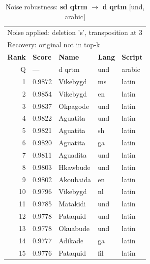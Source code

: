\begin{table}[htbp]
\centering
\small
\caption{Noise robustness: \textbf{sd qtrm} $\rightarrow$ \textbf{d qrtm} [und, arabic]}
\label{tab:noise-36}
\begin{tabular}{rllll}
\toprule
\multicolumn{5}{l}{\small Noise applied: deletion 's', transposition at 3} \\
\multicolumn{5}{l}{\small Recovery: original not in top-k} \\
\midrule
\textbf{Rank} & \textbf{Score} & \textbf{Name} & \textbf{Lang} & \textbf{Script} \\
\midrule
\rowcolor{gray!20} Q & --- & d qrtm & und & arabic \\
\midrule
1 & 0.9872 & Vikebygd & ms & latin \\
2 & 0.9854 & Vikebygd & en & latin \\
3 & 0.9837 & Okpagode & und & latin \\
4 & 0.9822 & Aguatita & und & latin \\
5 & 0.9821 & Aguatita & sh & latin \\
6 & 0.9820 & Aguatita & ga & latin \\
7 & 0.9811 & Aguadita & und & latin \\
8 & 0.9803 & Hkawbude & und & latin \\
9 & 0.9802 & Akoubaida & en & latin \\
10 & 0.9796 & Vikebygd & nl & latin \\
11 & 0.9785 & Matakidi & und & latin \\
12 & 0.9778 & Pataquid & und & latin \\
13 & 0.9778 & Okuabude & und & latin \\
14 & 0.9777 & Adikade & ga & latin \\
15 & 0.9776 & Pataquid & fil & latin \\
\bottomrule
\end{tabular}
\end{table}

